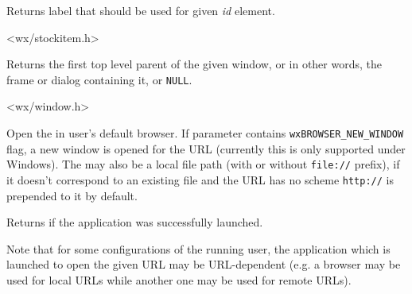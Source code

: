 \label{wxgetstocklabel}


Returns label that should be used for given {\it id} element.






<wx/stockitem.h>


\label{wxgettoplevelparent}


Returns the first top level parent of the given window, or in other words, the
frame or dialog containing it, or {\tt NULL}.


<wx/window.h>


\label{wxlaunchdefaultbrowser}


Open the  in user's default browser. If  parameter contains
\texttt{wxBROWSER\_NEW\_WINDOW} flag, a new window is opened for the URL
(currently this is only supported under Windows). The  may also be a
local file path (with or without \texttt{file://} prefix), if it doesn't
correspond to an existing file and the URL has no scheme \texttt{http://} is
prepended to it by default.

Returns \true if the application was successfully launched.

Note that for some configurations of the running user, the application which
is launched to open the given URL may be URL-dependent (e.g. a browser may be used for
local URLs while another one may be used for remote URLs).

